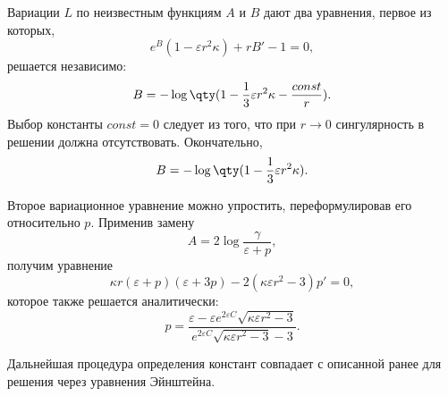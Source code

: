 \documentclass[\docroot/reports/draft/report.tex]{subfiles}
\begin{document}
    Вариации $L$ по неизвестным функциям $A$ и $B$ дают два уравнения, первое из которых,
    \begin{equation*}
        e^B (1 - \varepsilon r^2 \kappa) + r B' - 1 = 0 ,
    \end{equation*}
    решается независимо:
    \begin{equation*}
        B = - \log\qty(1 - \frac{1}{3} \varepsilon r^2 \kappa - \frac{const}{r}) .
    \end{equation*}
    Выбор константы $const = 0$ следует из того, что при $r \to 0$ сингулярность в решении должна отсутствовать. Окончательно,
    \begin{equation*}
        B = - \log\qty(1 - \frac{1}{3} \varepsilon r^2 \kappa) .
    \end{equation*}

    Второе вариационное уравнение можно упростить, переформулировав его относительно $p$. Применив замену
    \begin{equation*}
        A = 2 \log{\frac{\gamma}{\varepsilon + p}} ,
    \end{equation*}
    получим уравнение
    \begin{equation*}
        \kappa r (\varepsilon + p) (\varepsilon + 3 p) - 2 (\kappa \varepsilon r^2 - 3) p' = 0 ,
    \end{equation*}
    которое также решается аналитически:
    \begin{equation*}
        p = \frac{\varepsilon - \varepsilon e^{2 \varepsilon C} \sqrt{\kappa \varepsilon r^2 - 3}}{e^{2 \varepsilon C} \sqrt{\kappa \varepsilon r^2 - 3} - 3} .
    \end{equation*}

    Дальнейшая процедура определения констант совпадает с описанной ранее для решения через уравнения Эйнштейна.

\end{document}

